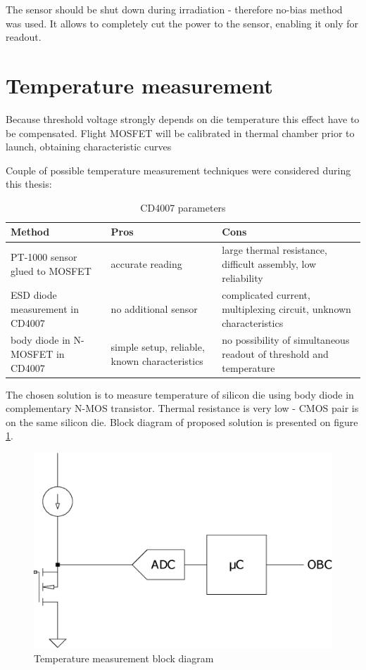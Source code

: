     The sensor should be shut down during irradiation - therefore no-bias method was used. It allows to completely cut the power to the sensor, enabling it only for readout.

\section{Temperature measurement}
    Because threshold voltage strongly depends on die temperature this effect have to be compensated. Flight MOSFET will be calibrated in thermal chamber prior to launch, obtaining characteristic curves

    Couple of possible temperature measurement techniques were considered during this thesis:
    \begin{table}[H]
    \begin{tabular}{R{4.5cm} | C{5cm} | C{5cm} }
        Method & Pros & Cons \\ \hline

        PT-1000 sensor glued to MOSFET & accurate reading & large thermal resistance, difficult assembly, low reliability \\ \hline

        ESD diode measurement in CD4007 & no additional sensor & complicated current, multiplexing circuit, unknown characteristics \\ \hline

        body diode in N-MOSFET in CD4007  & simple setup, reliable, known characteristics & no possibility of simultaneous readout of threshold and temperature
    \end{tabular}
    \caption{CD4007 parameters}
    \label{CD4007_parameters}
    \end{table}

    The chosen solution is to measure temperature of silicon die using body diode in complementary N-MOS transistor. Thermal resistance is very low - CMOS pair is on the same silicon die. Block diagram of proposed solution is presented on figure \ref{Temperature_measurement_block_diagram}.

    \begin{figure}[H]
        \centering
        \includegraphics[width=0.3\paperwidth]{img/n-mos-temperature.eps}
        \caption{Temperature measurement block diagram}
        \label{Temperature_measurement_block_diagram}
    \end{figure}

